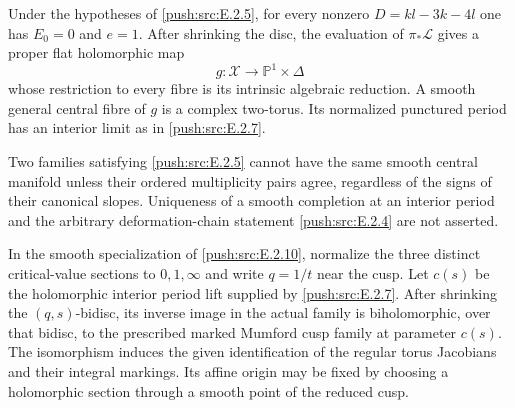 \begin{proposition}\hypertarget{tag-032V}{}\label{push:src:E.2.10}


Under the hypotheses of \ref{push:src:E.2.5}, for every nonzero
$D=kl-3k-4l$ one has $E_0=0$ and $e=1$.
After shrinking the disc, the evaluation of
$\pi_*\mathcal L$ gives a proper flat holomorphic map
\[
 g:\mathcal X\longrightarrow\mathbb P^1\times\Delta
\]
whose restriction to every fibre is its intrinsic algebraic
reduction.  A smooth general central fibre of $g$ is a
complex two-torus.  Its normalized punctured period has
an interior limit as in \ref{push:src:E.2.7}.

Two families satisfying \ref{push:src:E.2.5} cannot have the same smooth
central manifold unless their ordered multiplicity pairs
agree, regardless of the signs of their canonical slopes.
Uniqueness of a smooth completion at an interior period and
the arbitrary deformation-chain statement \ref{push:src:E.2.4} are not
asserted.
\end{proposition}

\begin{proposition}\hypertarget{tag-0336}{}\label{push:src:E.2.20}


In the smooth specialization of \ref{push:src:E.2.10}, normalize
the three distinct critical-value sections to
$0,1,\infty$ and write $q=1/t$ near the cusp.
Let $c(s)$ be the holomorphic interior period
lift supplied by \ref{push:src:E.2.7}.  After shrinking the
$(q,s)$-bidisc, its inverse image in the actual
family is biholomorphic, over that bidisc, to
the prescribed marked Mumford cusp family at
parameter $c(s)$.  The isomorphism induces
the given identification of the regular
torus Jacobians and their integral markings.
Its affine origin may be fixed by choosing
a holomorphic section through a smooth
point of the reduced cusp.
\end{proposition}

